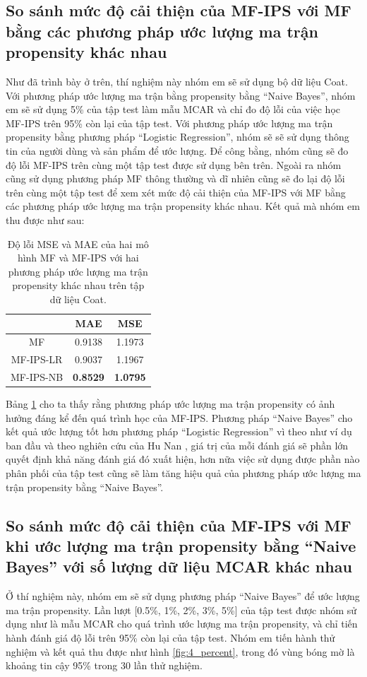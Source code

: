 \subsection{So sánh mức độ cải thiện của MF-IPS với MF bằng các phương pháp ước lượng ma trận propensity khác nhau}
Như đã trình bày ở trên, thí nghiệm này nhóm em sẽ sử dụng bộ dữ liệu Coat.
Với phương pháp ước lượng ma trận bằng propensity bằng ``Naive Bayes'', nhóm em sẽ sử dụng 5\% của tập test làm mẫu MCAR và chỉ đo độ lỗi của việc học MF-IPS trên 95\% còn lại của tập test. Với phương pháp ước lượng ma trận propensity bằng phương pháp ``Logistic Regression'', nhóm sẽ sẽ sử dụng thông tin của người dùng và sản phẩm để ước lượng. Để công bằng, nhóm cũng sẽ đo độ lỗi MF-IPS trên cùng một tập test được sử dụng bên trên. Ngoài ra nhóm cũng sử dụng phương pháp MF thông thường và dĩ nhiên cũng sẽ đo lại độ lỗi trên cùng một tập test để xem xét mức độ cải thiện của MF-IPS với MF bằng các phương pháp ước lượng ma trận propensity khác nhau. Kết quả mà nhóm em thu được như sau:

\begin{table}[h]
\centering
\begin{tabular}{|c|c|c|}
\hline
\multicolumn{1}{|l|}{} & MAE             & MSE             \\ \hline
MF                     & 0.9138          & 1.1973          \\ \hline
MF-IPS-LR              & 0.9037          & 1.1967          \\ \hline
MF-IPS-NB              & \textbf{0.8529} & \textbf{1.0795} \\ \hline
\end{tabular}
    \caption{Độ lỗi MSE và MAE của hai mô hình MF và MF-IPS với hai phương pháp ước lượng ma trận propensity khác nhau trên tập dữ liệu Coat.}
    \label{table:4_approach_estimate}
\end{table}

Bảng \ref{table:4_approach_estimate} cho ta thấy rằng phương pháp ước lượng ma trận propensity có ảnh hưởng đáng kể đến quá trình học của MF-IPS. Phương pháp ``Naive Bayes'' cho kết quả ước lượng tốt hơn phương pháp ``Logistic Regression'' vì theo như ví dụ ban đầu và theo nghiên cứu của Hu Nan \cite{bias_2017}, giá trị của mỗi đánh giá sẽ phần lớn quyết định khả năng đánh giá đó xuất hiện, hơn nữa việc sử dụng được phần nào phân phối của tập test cũng sẽ làm tăng hiệu quả của phương pháp ước lượng ma trận propensity bằng ``Naive Bayes''.

\subsection{So sánh mức độ cải thiện của MF-IPS với MF khi ước lượng ma trận propensity bằng ``Naive Bayes'' với số lượng dữ liệu MCAR khác nhau}
Ở thí nghiệm này, nhóm em sẽ sử dụng phương pháp ``Naive Bayes'' để ước lượng ma trận propensity. Lần lượt [0.5\%, 1\%, 2\%, 3\%, 5\%] của tập test được nhóm sử dụng như là mẫu MCAR cho quá trình ước lượng ma trận propensity, và chỉ tiến hành đánh giá độ lỗi trên 95\% còn lại của tập test. Nhóm em tiến hành thử nghiệm và kết quả thu được như hình \ref{fig:4_percent}, trong đó vùng bóng mờ là khoảng tin cậy 95\% trong 30 lần thử nghiệm.

